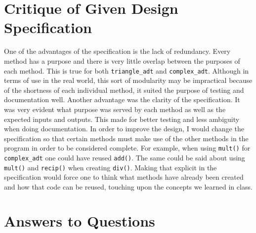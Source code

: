 \documentclass[12pt]{article}
\begin{document}
\section{Critique of Given Design Specification}

One of the advantages of the specification is the lack of redundancy. Every method has a purpose and there is very little overlap between the purposes of each method. This is true for both \verb|triangle_adt| and \verb|complex_adt|. Although in terms of use in the real world, this sort of modularity may be impractical because of the shortness of each individual method, it suited the purpose of testing and documentation well. Another advantage was the clarity of the specification. It was very evident what purpose was served by each method as well as the expected
inputs and outputs. This made for better testing and less ambiguity when doing documentation. 
In order to improve the design, I would change the specification so that certain methods must make use of the other methods in the program in order to be considered complete. For example,
when using \verb|mult()| for \verb|complex_adt| one could have reused \verb|add()|. The same could be said about using \verb|mult()| and \verb|recip()| when creating \verb|div()|. Making that explicit in the specification would force one to think what methods have already been created and how that code can be reused, touching upon the concepts we learned in class.

\section{Answers to Questions}
\end{document}
